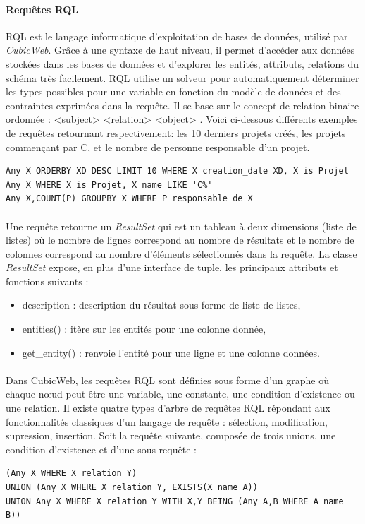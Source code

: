 \documentclass {report}
\begin{document}
\paragraph{Requêtes RQL}
RQL est le langage informatique d'exploitation de bases de données, utilisé par \textit{CubicWeb}. Grâce à une syntaxe de haut niveau, il permet d'accéder aux données stockées dans les bases de données et d'explorer les entités, attributs, relations du schéma très facilement. RQL utilise un solveur pour automatiquement déterminer les types possibles pour une variable en fonction du modèle de données et des contraintes exprimées dans la requête. Il se base sur le concept de relation binaire ordonnée : <subject> <relation> <object> . Voici ci-dessous différents exemples de requêtes retournant respectivement: les 10 derniers projets créés, les projets commençant par C, et le nombre de personne responsable d'un projet.

\renewcommand{\lstlistingname}{Exemple}
\begin{lstlisting}[caption= Requêtes RQL]
Any X ORDERBY XD DESC LIMIT 10 WHERE X creation_date XD, X is Projet
Any X WHERE X is Projet, X name LIKE 'C%'
Any X,COUNT(P) GROUPBY X WHERE P responsable_de X
\end{lstlisting}

\paragraph{}
    Une requête retourne un \textit{ResultSet} qui est un tableau à deux dimensions (liste de listes) où le nombre de lignes correspond au nombre de résultats et le nombre de colonnes correspond au nombre d'éléments sélectionnés dans la requête. La classe \textit{ResultSet} expose, en plus d’une interface de tuple, les principaux attributs et fonctions suivants :
\begin{itemize}
\item description : description du résultat sous forme de liste de listes,
\item entities() : itère sur les entités pour une colonne donnée,
\item get\_entity() : renvoie l’entité pour une ligne et une colonne
données.
\end{itemize}

\paragraph{}
Dans CubicWeb, les requêtes RQL sont définies sous forme d'un graphe où chaque nœud peut être une variable, une constante, une condition d'existence ou une relation. Il existe quatre types d'arbre de requêtes RQL répondant aux fonctionnalités classiques d'un langage de requête : sélection, modification, supression, insertion. Soit la requête suivante, composée de trois unions, une condition d'existence et d'une sous-requête : 
\begin{lstlisting}[caption= Requête RQL]
(Any X WHERE X relation Y) 
UNION (Any X WHERE X relation Y, EXISTS(X name A))
UNION Any X WHERE X relation Y WITH X,Y BEING (Any A,B WHERE A name B))
\end{lstlisting}
\end{document}
